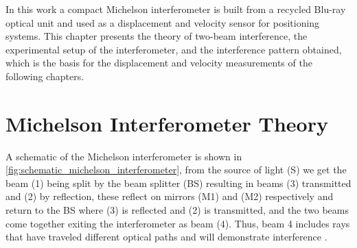 In this work a compact Michelson interferometer is built from a recycled Blu-ray optical unit and used as a displacement and velocity sensor for positioning systems. This chapter presents the theory of two-beam interference, the experimental setup of the interferometer, and the interference pattern obtained, which is the basis for the displacement and velocity measurements of the following chapters.


\section{Michelson Interferometer Theory}
A schematic of the Michelson interferometer is shown in \cref{fig:schematic_michelson_interferometer}, from the source of light (S) we get the beam (1) being split by the beam splitter (BS) resulting in beams (3) transmitted and (2) by reflection, these reflect on mirrors (M1) and (M2) respectively and return to the BS where (3) is reflected and (2) is transmitted, and the two beams come together exiting the interferometer as beam (4). Thus, beam 4 includes rays that have traveled different optical paths and will demonstrate interference \cite[Chap 8.]{pedrottiIntroductionOptics2007}.

